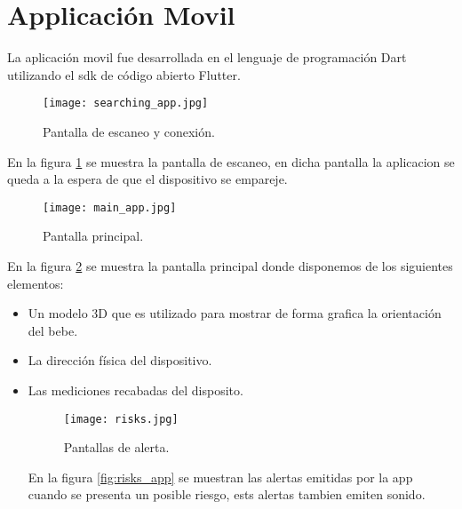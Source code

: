 \section{Applicación Movil}
    La aplicación movil fue desarrollada en el lenguaje de 
    programación Dart utilizando el \acrshort{sdk} de código abierto 
    Flutter. 

    \begin{figure}[htp!]
        \centering
        \texttt{[image: searching\_app.jpg]}
        \caption{Pantalla de escaneo y conexión.}
        \label{fig: searching_app}
    \end{figure}
    \FloatBarrier

    En la figura \ref{fig: searching_app} se muestra la pantalla de escaneo, en dicha 
    pantalla la aplicacion se queda a la espera de que el dispositivo
    se empareje.

    \begin{figure}[htp!]
        \centering
        \texttt{[image: main\_app.jpg]}
        \caption{Pantalla principal.}
        \label{fig: main_app}
    \end{figure}
    \FloatBarrier

    En la figura \ref{fig: main_app} se muestra la pantalla principal donde disponemos de los
    siguientes elementos: 
        \begin{itemize}
            \item Un modelo 3D que es utilizado para mostrar de forma grafica 
            la orientación del bebe.
            \item La dirección física del dispositivo.
            \item Las mediciones recabadas del disposito.
        
        \begin{figure}[htp!]
            \centering
            \texttt{[image: risks.jpg]}
            \caption{Pantallas de alerta.}
            \label{fig: risks_app}
        \end{figure}
        \FloatBarrier
        
    En la figura \ref{fig:risks_app} se muestran las alertas emitidas por la app cuando se presenta
    un posible riesgo, ests alertas tambien emiten sonido.

    \end{itemize}


